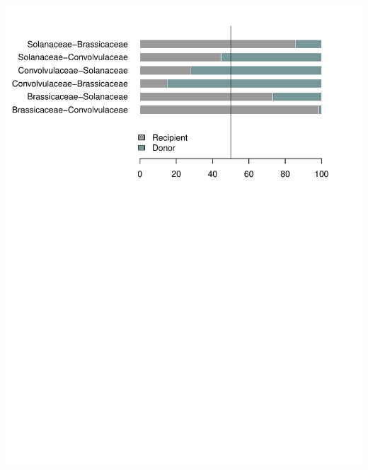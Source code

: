 \documentclass[
  12pt,
]{article}
\begin{document}
\newpage

\includegraphics{Supp_Material_files/figure-latex/unnamed-chunk-5-1.pdf}

\newpage
\end{document}

